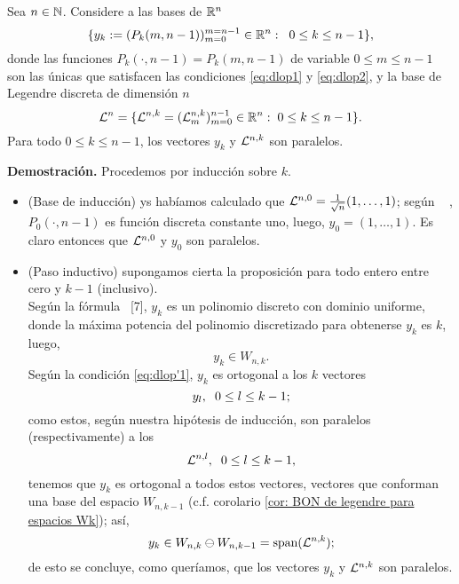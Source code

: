 \begin{lema}
\label{prop: legendre y DLOPS son paralelos}
Sea $n \in \mathbb{N}$. 
Considere a 
las bases de $\mathbb{R}^{n}$
\begin{equation}
\label{eq0: base DLOP}
\{
y_{k}:= (P_{k}(m, n-1))_{m=0}^{m=n-1} \in \mathbb{R}^{n}
: \hspace{0.2cm} 0 \leq k \leq n-1
\},
\end{equation}
donde las funciones $P_{k}(\cdot , n-1)= P_{k}(m , n-1)$ de variable 
$0 \leq m \leq n-1$
son las únicas que satisfacen las condiciones
\eqref{eq:dlop1} y \eqref{eq:dlop2},
y la base de Legendre discreta de dimensión $n$
\begin{equation}
\label{eq0: base de Legendre discreta}
\mathcal{L}^{n}=\{ \mathcal{L}^{n,k}= (\mathcal{L}_{m}^{n,k})_{m=0}^{n-1} \in \mathbb{R}^{n} : 
\hspace{0.1cm} 0 \leq k \leq n-1\}.
\end{equation}
Para todo $0 \leq k \leq n-1$, los vectores 
$y_{k}$ y $\mathcal{L}^{n,k}$ son paralelos.
\end{lema}
\noindent
\textbf{Demostración.}
Procedemos por inducción sobre $k$.
\begin{itemize}
	\item  (Base de inducción) ys habíamos calculado que
	$\mathcal{L}^{n,0}=\frac{1}{\sqrt{n}}(1, \ldots , 1)$; 
	según ~\cite{Neuman}
	,
	 $P_{0}(\cdot , n-1)$ es función discreta constante uno, 
	luego, $y_{0}=(1, \ldots , 1)$. 
	Es	
	claro entonces que $\mathcal{L}^{n,0}$ 
	y $y_{0}$	
	son paralelos.
	
	\item (Paso inductivo) supongamos cierta la proposición para
	todo entero entre cero y $k-1$ (inclusivo).	\\
	Según la fórmula
	~\cite{Neuman}[7], $y_{k}$ es
	un polinomio discreto con dominio 
	uniforme, donde la máxima potencia
	del polinomio discretizado para obtenerse 
	$y_{k}$ es $k$, luego,
	\[
	y_{k} \in W_{n,k}.
	\]	
	Según la condición \eqref{eq:dlop'1}, $y_{k}$ es ortogonal a
	los $k$ vectores
	\[
	y_{l}, \hspace{0.2cm} 0 \leq l \leq k-1;
	\] 
	como estos, según
	nuestra hipótesis de inducción, son paralelos (respectivamente)
	a los
	\[
	\mathcal{L}^{n, l}, \hspace{0.2cm} 0 \leq l \leq k-1,
	\] 
	tenemos que $y_{k}$ es ortogonal a todos estos vectores,
	vectores que conforman una base del espacio $W_{n,k-1}$
	(c.f. corolario \ref{cor: BON de legendre para espacios Wk}); así,
	\[
	y_{k} \in W_{n,k} 
	\ominus W_{n,k-1}=\text{span}(\mathcal{L}^{n,k});
	\]
	de esto se concluye, como queríamos, que los vectores 
	$y_{k}$ y $\mathcal{L}^{n,k}$
	son paralelos. \QEDB 
\end{itemize}
\vspace{0.2cm}



